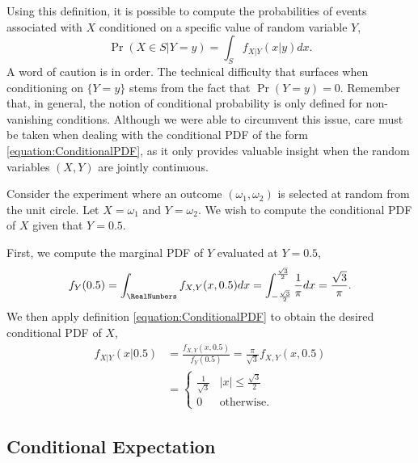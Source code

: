 Using this definition, it is possible to compute the probabilities of events associated with $X$ conditioned on a specific value of random variable $Y$,
\begin{equation*}
\Pr (X \in S | Y = y) = \int_S f_{X|Y} (x|y) dx .
\end{equation*}
A word of caution is in order.
The technical difficulty that surfaces when conditioning on $\{ Y = y \}$ stems from the fact that $\Pr (Y = y) = 0$.
Remember that, in general, the notion of conditional probability is only defined for non-vanishing conditions.
Although we were able to circumvent this issue, care must be taken when dealing with the conditional PDF of the form \eqref{equation:ConditionalPDF}, as it only provides valuable insight when the random variables $(X, Y)$ are jointly continuous.

\begin{example}
Consider the experiment where an outcome $(\omega_1, \omega_2)$ is selected at random from the unit circle.
Let $X = \omega_1$ and $Y = \omega_2$.
We wish to compute the conditional PDF of $X$ given that $Y = 0.5$.

First, we compute the marginal PDF of $Y$ evaluated at $Y = 0.5$,
\begin{equation*}
f_Y (0.5) = \int_{\RealNumbers} f_{X,Y} (x, 0.5) dx
= \int_{-\frac{\sqrt{3}}{2}}^{\frac{\sqrt{3}}{2}} \frac{1}{\pi} dx
= \frac{\sqrt{3}}{\pi} .
\end{equation*}
We then apply definition \eqref{equation:ConditionalPDF} to obtain the desired conditional PDF of $X$,
\begin{equation*}
\begin{split}
f_{X|Y} ( x | 0.5 ) &= \frac{f_{X,Y} (x, 0.5)}{f_{Y} ( 0.5 ) }
= \frac{\pi}{\sqrt{3}} f_{X,Y} (x, 0.5) \\
&= \begin{cases} \frac{1}{\sqrt{3}} & |x| \leq \frac{\sqrt{3}}{2} \\
0 & \text{otherwise} . \end{cases}
\end{split}
\end{equation*}
\end{example}


\subsection{Conditional Expectation}

